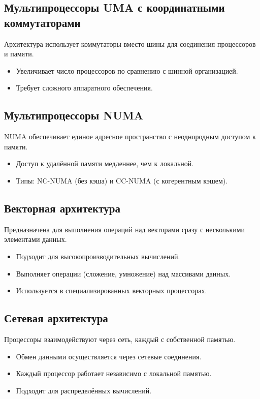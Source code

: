 	\newpage
	
	\subsection{Мультипроцессоры UMA с координатными коммутаторами}
	Архитектура использует коммутаторы вместо шины для соединения процессоров и памяти.
	\begin{itemize}
		\item Увеличивает число процессоров по сравнению с шинной организацией.
		\item Требует сложного аппаратного обеспечения.
	\end{itemize}
	
	\subsection{Мультипроцессоры NUMA}
	NUMA обеспечивает единое адресное пространство с неоднородным доступом к памяти.
	\begin{itemize}
		\item Доступ к удалённой памяти медленнее, чем к локальной.
		\item Типы: NC-NUMA (без кэша) и CC-NUMA (с когерентным кэшем).
	\end{itemize}
	
	\subsection{Векторная архитектура}
	Предназначена для выполнения операций над векторами сразу с несколькими элементами данных.
	\begin{itemize}
		\item Подходит для высокопроизводительных вычислений.
		\item Выполняет операции (сложение, умножение) над массивами данных.
		\item Используется в специализированных векторных процессорах.
	\end{itemize}
	
	\subsection{Сетевая архитектура}
	Процессоры взаимодействуют через сеть, каждый с собственной памятью.
	\begin{itemize}
		\item Обмен данными осуществляется через сетевые соединения.
		\item Каждый процессор работает независимо с локальной памятью.
		\item Подходит для распределённых вычислений.
	\end{itemize}
	
